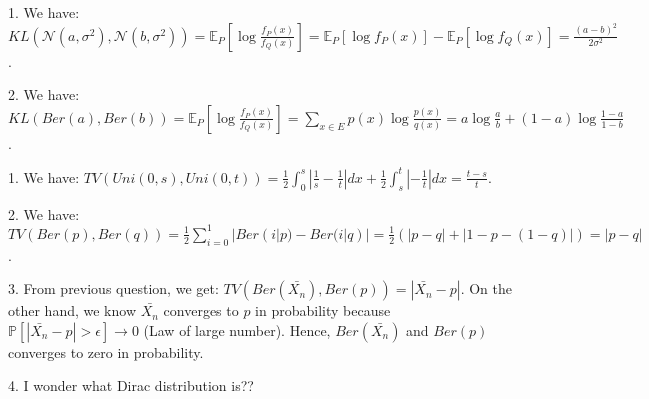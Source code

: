 \documentclass[10pt]{article}
\newenvironment{problem}[2][Problem]{\begin{trivlist}
\item[\hskip \labelsep {\bfseries #1}\hskip \labelsep {\bfseries #2.}]}{\end{trivlist}}
\begin{document}
\begin{problem}{3}
\item 1.
We have: $KL(\mathcal{N}(a, \sigma^2), \mathcal{N}(b, \sigma^2))=\mathbb{E}_P\left[\log{\frac{f_P(x)}{f_Q(x)}}\right]=\mathbb{E}_P\left[\log{f_P(x)}\right] - \mathbb{E}_P\left[\log{f_Q(x)}\right] = \frac{(a-b)^2}{2\sigma^2}$.\\
\item 2.
We have: $KL(Ber(a), Ber(b))=\mathbb{E}_P\left[\log{\frac{f_P(x)}{f_Q(x)}}\right]=\sum_{x \in E}p(x)\log{\frac{p(x)}{q(x)}} = a\log{\frac{a}{b}} + (1-a)\log{\frac{1-a}{1-b}}$.\\

\end{problem}


\begin{problem}{4}
\item 1.
We have: $TV(Uni(0,s), Uni(0,t))=\frac{1}{2}\int_{0}^{s}|\frac{1}{s}-\frac{1}{t}|dx + \frac{1}{2}\int_{s}^{t}|-\frac{1}{t}|dx=\frac{t-s}{t}$.\\
\item 2.
We have: $TV(Ber(p), Ber(q))=\frac{1}{2}\sum_{i=0}^{1}|Ber(i|p)-Ber(i|q)|=\frac{1}{2}(|p-q|+|1-p-(1-q)|)=|p-q|$.\\
\item 3.
From previous question, we get: $TV(Ber(\bar{X_n}), Ber(p))=|\bar{X_n}-p|$. On the other hand, we know $\bar{X_n}$ converges to $p$ in probability because $\mathbb{P}[|\bar{X_n}-p|>\epsilon] \longrightarrow 0$ (Law of large number). Hence, $Ber(\bar{X_n})$ and $Ber(p)$ converges to zero in probability.
\item 4. I wonder what Dirac distribution is??
\end{problem}
\end{document}
